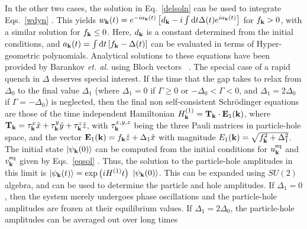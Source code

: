 \documentclass[aps,pra,floats,epsfig,pdflatex]{revtex4}                                                              %
\begin{document}
 {In the other two cases, the solution in Eq.}~\ref{delsoln}  {can be used to integrate Eqs.}~\ref{wdyn} {. This yields $w_{\bf k}(t)=e^{-ia_{\bf k}(t)}\left[d_{\bf k}-i\int\mathrm{d} t\Delta(t)e^{ia_{\bf k}(t)}\right]$ for $f_{\bf k}>0$, with a similar solution for $f_{\bf k}\leq0$. Here, $d_{\bf k}$ is a constant determined from the initial conditions, and $a_{\bf k}(t)=\int \mathrm{d} t \left[f_{\bf k}-\Delta(t)\right]$ can be evaluated in terms of Hyper-geometric polynomials. Analytical solutions to these equations have been provided by Barankov \textit{et. al.} using Bloch vectors}~\cite{barankov} {. The special case of a rapid quench in $\Delta$ deserves special interest. If the time that the gap takes to relax from $\Delta_0$ to the final value $\Delta_1$ 
(where $\Delta_1=0$ if $\Gamma\geq0$ or $-\Delta_0<\Gamma<0$, and $\Delta_1=2\Delta_0$ if $\Gamma=-\Delta_0$) is neglected, then the final non self-consistent Schr\"odinger equations are those of the time independent Hamiltonian $H^{(1)}_{\bf k}={\bf T}_{\bf k}\cdot{\bf E}_1({\bf k})$, where ${\bf T}_{\bf k}=\tau^x_{\bf k}\hat{x}+\tau^y_{\bf k}\hat{y}+\tau^z_{\bf k}\hat{z}$, with $\tau^{x,y,z}_{\bf k}$ being the three Pauli matrices in particle-hole space, and the vector  ${\bf E}_1({\bf k})=f_{\bf k}\hat{z}+\Delta_1\hat{x}$ with magnitude $E_1({\bf k})=\sqrt{f^2_{\bf k}+\Delta^2_1}$. The initial state $|\psi_{\bf k}(0)\rangle$ can be computed from the initial conditions for $u^{\rm eq}_{\bf k}$ and $v^{\rm eq}_{\bf k}$ given by Eqs.}~\ref{eqsol} {. Thus, the solution to the particle-hole amplitudes in this limit is
$|\psi_{\bf k}(t)\rangle=\exp{\left(iH^{(1)} t\right)}$ $|\psi_{\bf k}(0)\rangle$. This can be expanded using $SU(2)$ algebra, and can be used to determine the particle and hole amplitudes.}
 {If $\Delta_1=0$, then the system merely undergoes phase oscillations and the particle-hole amplitudes  are frozen at their equilibrium values. If $\Delta_1=2\Delta_0$, the particle-hole amplitudes can be averaged out over long times}
\end{document}
